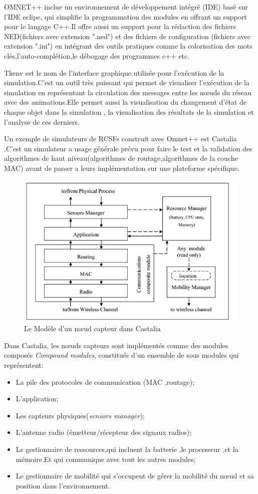 OMNET++ inclue un environnement de développement intégré (IDE) basé sur l'IDE eclipe, qui simplifie  la programmation des modules en offrant un support pour le langage C++.Il offre aussi un support pour la rédaction des fichiers NED(fichiers avec extension ".ned") et des fichiers de configuration (fichiers avec extension ".ini") en intégrant des outils pratiques comme la colorisation des mots clés,l'auto-complétion,le débogage des programmes c++ etc.

Tkenv est le nom de l'interface graphique utilisée pour l'exécution de la simulation.C'est un outil très puissant qui permet de visualiser  l'exécution de la simulation en représentant la circulation des messages entre les nœuds du réseau avec des animations.Elle permet aussi la visualisation du changement d'état de chaque objet dans la simulation , la visualisation des résultats de la simulation et l'analyse de ces derniers.

Un exemple de simulateurs de RCSFs construit avec Omnet++ est Castalia .C'est un simulateur a usage générale prévu pour faire le test et la validation des algorithmes de haut niveau(algorithmes de routage,algorithmes de la couche MAC) avant de passer a leurs implémentation sur une plateforme spécifique.
\begin{figure}[!h]
\includegraphics[scale=0.8]{castaliaModel}
\caption{\label{castaliaModel}Le Modèle d'un nœud capteur dans Castalia}
\end{figure}
Dans Castalia, les nœuds capteurs sont implémentés comme des modules composés \emph{Compound modules}, constitués d'un ensemble de sous modules qui représentent:
\begin{itemize}
\item La pile des protocoles de communication (MAC ,routage);%
\item L'application;
\item Les capteurs physiques(\emph{sensors manager});
\item L'antenne radio (émetteur/récepteur des signaux radios);
\item Le gestionnaire de ressources,qui incluent la batterie ,le processeur ,et la mémoire.Et qui communique avec tout les autres modules;
\item Le gestionnaire de mobilité qui s'occupent de gérer la mobilité du nœud et sa position dans l'environnement.
\end{itemize}

